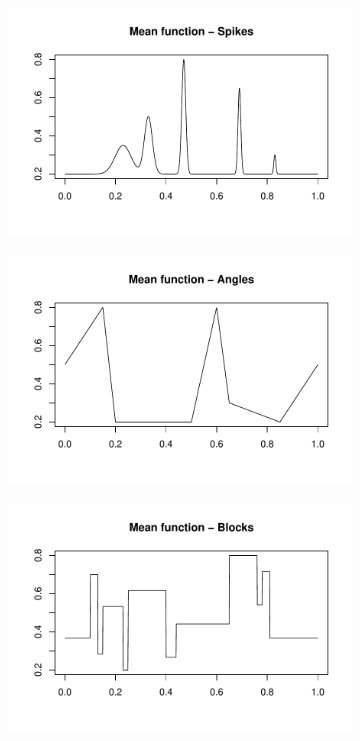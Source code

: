\documentclass[12pt]{article}
\begin{document}
\begin{figure}
\centering
    \begin{subfigure}[b]{0.48\textwidth}
        \centering
        \includegraphics[width=\textwidth]{gaus_sp.pdf}
        \caption{}
        \label{fig:gaus_sp}
    \end{subfigure}
		\hfill
    \begin{subfigure}[b]{0.48\textwidth}
        \centering
        \includegraphics[width=\textwidth]{gaus_ang.pdf}
        \caption{}
        \label{fig:gaus_ang}
    \end{subfigure}
		\hfill
    \begin{subfigure}[b]{0.48\textwidth}
        \centering
        \includegraphics[width=\textwidth]{gaus_blk.pdf}

\end{subfigure}
\end{figure}
\end{document}

